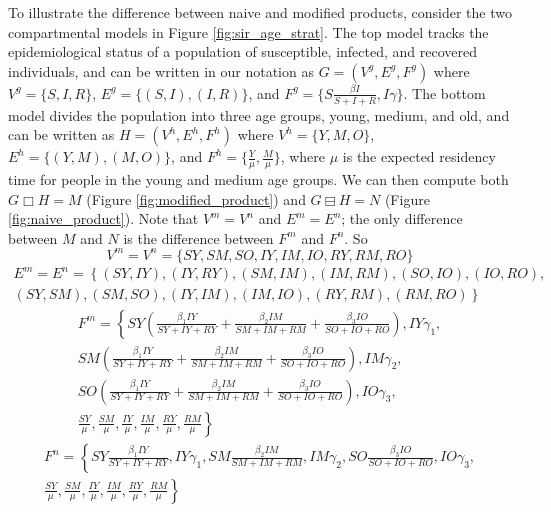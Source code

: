 \documentclass{article}
\theoremstyle{definition}
\begin{document}
To illustrate the difference between naive and modified products, consider the two compartmental models in Figure \ref{fig:sir_age_strat}. The top model tracks the epidemiological status of a population of susceptible, infected, and recovered individuals, and can be written in our notation as $G = (V^g, E^g, F^g)$ where $V^g = \{ S, I, R\}$, $E^g=\{(S, I), (I, R)\}$, and $F^g = \{S\frac{\beta I}{S+I+R}, I\gamma \}$. The bottom model divides the population into three age groups, young, medium, and old, and can be written as $H = (V^h, E^h, F^h)$ where $V^h = \{Y, M, O\}$, $E^h = \{(Y, M), (M, O)\}$, and $F^h = \{\frac{Y}{\mu}, \frac{M}{\mu}\}$, where $\mu$ is the expected residency time for people in the young and medium age groups. We can then compute both $G\Box H = M$ (Figure \ref{fig:modified_product}) and $G\boxminus H = N$ (Figure \ref{fig:naive_product}). Note that $V^m = V^n$ and $E^m = E^n$; the only difference between $M$ and $N$ is the difference between $F^m$ and $F^n$. So
    \begin{equation}
        V^m = V^n = \{SY, SM, SO, IY, IM, IO, RY, RM, RO\}
    \end{equation}
    \begin{multline}
        E^m = E^n = \left\{ (SY, IY), (IY, RY), (SM, IM), (IM, RM), (SO, IO), (IO, RO), \right.\\ \left. (SY, SM), (SM, SO), (IY, IM), (IM, IO), (RY, RM), (RM, RO)\right\}
    \end{multline}
    \begin{multline}\label{normex1}
        F^m = \left\{SY\left(\frac{\beta_1 IY}{SY+IY+RY} + \frac{\beta_2 IM}{SM+IM+RM}+\frac{\beta_3 IO}{SO+IO+RO}\right), IY\gamma_1,\right.\\ \left.SM\left(\frac{\beta_1 IY}{SY+IY+RY} + \frac{\beta_2 IM}{SM+IM+RM}+\frac{\beta_3 IO}{SO+IO+RO}\right) ,IM\gamma_2,\right. \\ \left. SO\left(\frac{\beta_1 IY}{SY+IY+RY} + \frac{\beta_2 IM}{SM+IM+RM}+\frac{\beta_3 IO}{SO+IO+RO}\right), IO\gamma_3,\right. \\ \left.  \frac{SY}{\mu}, \frac{SM}{\mu}, \frac{IY}{\mu}, \frac{IM}{\mu}, \frac{RY}{\mu}, \frac{RM}{\mu} \right\}
    \end{multline}
    \begin{multline}\label{normex2}
        F^n = \left\{SY\frac{\beta_1 IY}{SY+IY+RY}, IY\gamma_1,  SM\frac{\beta_2 IM}{SM+IM+RM}, IM\gamma_2, SO\frac{\beta_3 IO}{SO+IO+RO}, IO\gamma_3,\right. \\ \left. \frac{SY}{\mu}, \frac{SM}{\mu}, \frac{IY}{\mu}, \frac{IM}{\mu}, \frac{RY}{\mu}, \frac{RM}{\mu} \right\}
    \end{multline}
\end{document}
